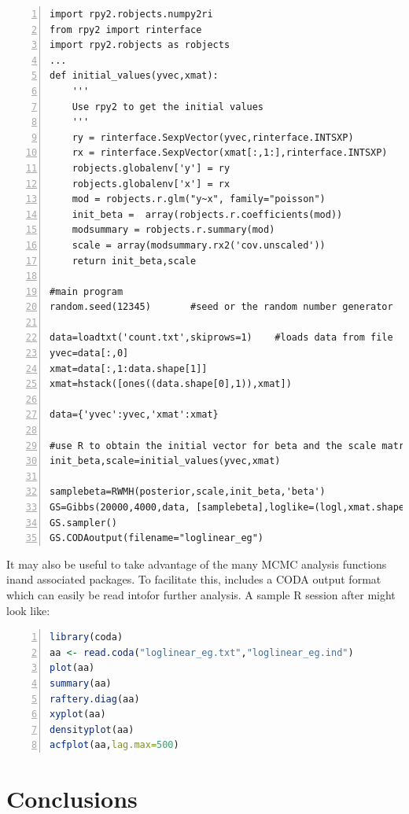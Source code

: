 \documentclass[article]{jss}
\begin{document}
\begin{lstlisting}[basicstyle={\scriptsize},numbers=left,tabsize=4]
import rpy2.robjects.numpy2ri
from rpy2 import rinterface
import rpy2.robjects as robjects
...
def initial_values(yvec,xmat):
    '''
    Use rpy2 to get the initial values
    '''
    ry = rinterface.SexpVector(yvec,rinterface.INTSXP)
    rx = rinterface.SexpVector(xmat[:,1:],rinterface.INTSXP)
    robjects.globalenv['y'] = ry
    robjects.globalenv['x'] = rx
    mod = robjects.r.glm("y~x", family="poisson")
    init_beta =  array(robjects.r.coefficients(mod))
    modsummary = robjects.r.summary(mod)
    scale = array(modsummary.rx2('cov.unscaled'))
    return init_beta,scale

#main program
random.seed(12345)       #seed or the random number generator

data=loadtxt('count.txt',skiprows=1)    #loads data from file
yvec=data[:,0]
xmat=data[:,1:data.shape[1]]
xmat=hstack([ones((data.shape[0],1)),xmat])

data={'yvec':yvec,'xmat':xmat} 

#use R to obtain the initial vector for beta and the scale matrix
init_beta,scale=initial_values(yvec,xmat)

samplebeta=RWMH(posterior,scale,init_beta,'beta')
GS=Gibbs(20000,4000,data, [samplebeta],loglike=(logl,xmat.shape[1],'yvec'))
GS.sampler()
GS.CODAoutput(filename="loglinear_eg") 

\end{lstlisting}


It may also be useful to take advantage of the many MCMC analysis
functions inand associated packages. To facilitate this,
 includes a CODA
\citet{Rnews:Plummer+Best+Cowles+Vines:2006} output format which can
easily be read intofor further analysis. A sample R
session after  might look like:


\begin{lstlisting}[basicstyle={\scriptsize},language=R,numbers=left]
library(coda)
aa <- read.coda("loglinear_eg.txt","loglinear_eg.ind")
plot(aa)
summary(aa)
raftery.diag(aa)
xyplot(aa)
densityplot(aa)
acfplot(aa,lag.max=500)

\end{lstlisting}



\section{Conclusions}
\label{sec:Conclusions}
\end{document}

